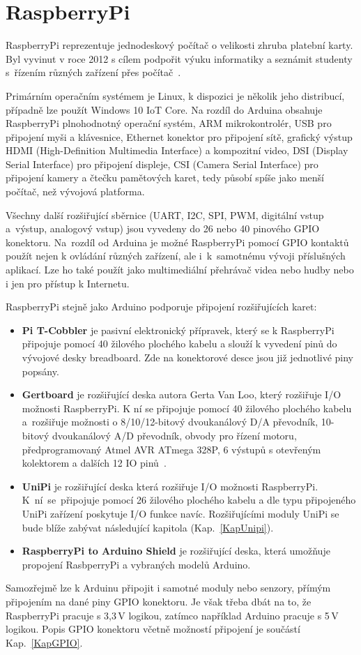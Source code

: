 \section{RaspberryPi}
\label{KapRaspi}

RaspberryPi reprezentuje jednodeskový počítač o velikosti zhruba platební karty. Byl vyvinut v roce 2012 s cílem podpořit výuku informatiky a seznámit studenty s~řízením různých zařízení přes počítač~\cite{Raspi}. 

Primárním operačním systémem je Linux, k dispozici je několik jeho distribucí, případně lze použít Windows 10 IoT Core. Na rozdíl do Arduina obsahuje RaspberryPi plnohodnotný operační systém, ARM mikrokontrolér, USB pro připojení myši a klávesnice, Ethernet konektor pro připojení sítě, grafický výstup HDMI (High-Definition Multimedia Interface) a kompozitní video, DSI (Display Serial Interface) pro připojení displeje, CSI (Camera Serial Interface) pro připojení kamery a čtečku pamětových karet, tedy působí spíše jako menší počítač, než vývojová platforma. 

Všechny další rozšiřující sběrnice (UART, I2C, SPI, PWM, digitální vstup a~výstup, analogový vstup) jsou vyvedeny do 26 nebo 40 pinového GPIO konektoru. Na~rozdíl od Arduina je možné RaspberryPi pomocí GPIO kontaktů použít nejen k ovládání různých zařízení, ale i~k~samotnému vývoji příslušných aplikací. Lze ho také použít jako multimediální přehrávač videa nebo hudby nebo i jen pro přístup k Internetu.

RaspberryPi stejně jako Arduino podporuje připojení rozšiřujících karet:

\begin{itemize}
	\item \textbf{Pi T-Cobbler} je pasivní elektronický přípravek, který se k RaspberryPi připojuje pomocí 40 žilového plochého kabelu a slouží k vyvedení pinů do vývojové desky breadboard. Zde na konektorové desce jsou již jednotlivé piny popsány.
\item \textbf{Gertboard} je rozšiřující deska autora Gerta Van Loo, který rozšiřuje I/O možnosti RaspberryPi. K ní se připojuje pomocí 40 žilového plochého kabelu a~rozšiřuje možnosti o 8/10/12-bitový dvoukanálový D/A převodník, 10-bitový dvoukanálový A/D převodník, obvody pro řízení motoru, předprogramovaný Atmel AVR ATmega 328P, 6 výstupů s otevřeným kolektorem a dalších 12 IO pinů~\cite{GertBoard}.  
\item \textbf{UniPi} je rozšiřující deska která rozšiřuje I/O možnosti RaspberryPi. K~ní~se~připojuje pomocí 26 žilového plochého kabelu a dle typu připojeného UniPi zařízení poskytuje I/O funkce navíc. Rozšiřujícími moduly UniPi se bude blíže zabývat následující kapitola (Kap.~\ref{KapUnipi}).
\item \textbf{RaspberryPi to Arduino Shield} je rozšiřující deska, která umožňuje propojení RasbperryPi a vybraných modelů Arduino.
\end{itemize}
Samozřejmě lze k Arduinu připojit i samotné moduly nebo senzory, přímým připojením na dané piny GPIO konektoru. Je však třeba dbát na to, že RaspberryPi pracuje s 3,3\,V logikou, zatímco například Arduino pracuje s 5\,V logikou. Popis GPIO konektoru včetně možností připojení je součástí Kap.~\ref{KapGPIO}.


